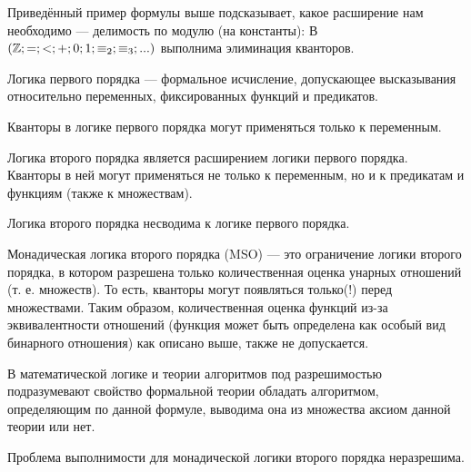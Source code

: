     
    \begin{Thm}
        Приведённый пример формулы выше подсказывает, какое расширение нам необходимо --- делимость по модулю (на константы): В $(\mathbb{Z}; =; <; +; 0; 1; \equiv_2; \equiv_3; ...)$ выполнима элиминация кванторов.
    \end{Thm}

    
    
    \begin{Def}
        Логика первого порядка --- формальное исчисление, допускающее высказывания относительно переменных, фиксированных функций и предикатов.
    \end{Def}
    \begin{Rem}
        Кванторы в логике первого порядка могут применяться только к переменным.
    \end{Rem}
    \begin{Def}
        Логика второго порядка является расширением логики первого порядка. Кванторы в ней могут применяться не только к переменным, но и к предикатам и функциям (также к множествам).
    \end{Def}
    \begin{Rem}
        Логика второго порядка несводима к логике первого порядка.
    \end{Rem}
    \begin{Def}
        Монадическая логика второго порядка (MSO) — это ограничение логики второго порядка, в котором разрешена только количественная оценка унарных отношений (т. е. множеств). То есть, кванторы могут появляться только(!) перед множествами. Таким образом, количественная оценка функций из-за эквивалентности отношений (функция может быть определена как особый вид бинарного отношения) как описано выше, также не допускается.
    \end{Def}

    
    \begin{Def}
        В математической логике и теории алгоритмов под разрешимостью подразумевают свойство формальной теории обладать алгоритмом, определяющим по данной формуле, выводима она из множества аксиом данной теории или нет.
    \end{Def}
    \begin{Thm}
        Проблема выполнимости для монадической логики второго порядка неразрешима.
    \end{Thm}
    
